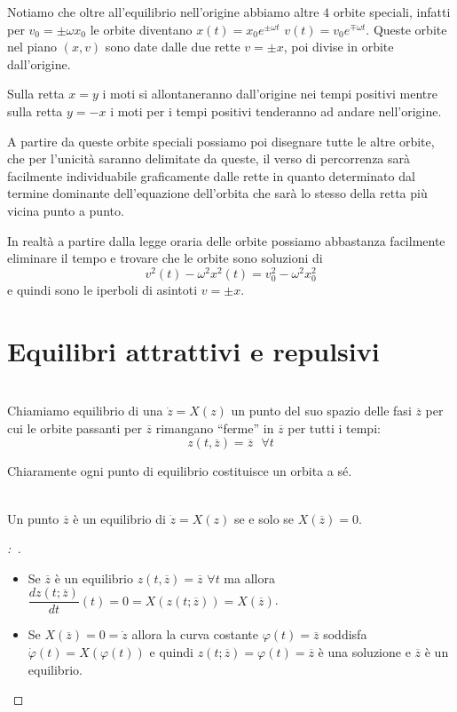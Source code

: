 \documentclass[11pt,a4paper,twoside]{book}
\newenvironment{proposizione}[1][\empty]{\begin{Proposizione}{
\ifx\empty#1\relax\else\mdseries\itshape#1\\\fi
}{}}{\end{Proposizione}}
\newenvironment{definizione}[1][\empty]{\begin{Definizione}{
\ifx\empty#1\relax\else\mdseries\itshape#1\\\fi
}{}}{\end{Definizione}}
\newenvironment{esempio}[1][Esempio]{ 
  \begin{center}\begin{tcolorbox}[
  title={#1:\\},
  width=0.9\linewidth,
  flush right,
  enhanced jigsaw, 
  colback=white, 
  frame hidden, 
  sharpish corners, arc=3mm,
  borderline west = {1pt}{0pt}{gray},
  borderline south = {1pt}{0pt}{gray},
  coltitle=black, 
  fonttitle=\small\bfseries, 
  attach title to upper, 
  breakable,
  top=2.5pt, bottom=0.3pt]\small
  }{
 \normalsize \end{tcolorbox}\end{center}
}
\newenvironment{dimo}[1][\proofname]{
	\begin{tcolorbox}[
	breakable, 
	enhanced, 
	interior hidden, 
	frame hidden, 
	borderline west = {1pt}{0pt}{gray}, 
	top=0pt, bottom=0pt, left=0pt]
\begin{proof}[#1:~]
}
{
\end{proof}
\end{tcolorbox}
}
\theoremstyle{esss}
\theoremstyle{dotless}
\numberwithin{equation}{section} %
\begin{document}
\begin{esempio}[Oscillatore e Repulsore armonico]
\begin{itemize}
Notiamo che oltre all'equilibrio nell'origine abbiamo altre $4$ orbite speciali, infatti per $v_0=\pm\omega x_0$ le orbite diventano $x(t)=x_0e^{\pm\omega t}$ $v(t)=v_0e^{\mp\omega t}$.
Queste orbite nel piano $(x,v)$ sono date dalle due rette $v=\pm x$, poi divise in orbite dall'origine.

Sulla retta $x=y$ i moti si allontaneranno dall'origine nei tempi positivi mentre sulla retta $y=-x$ i moti per i tempi positivi tenderanno ad andare nell'origine.

A partire da queste orbite speciali possiamo poi disegnare tutte le altre orbite, che per l'unicità saranno delimitate da queste, il verso di percorrenza sarà facilmente individuabile graficamente dalle rette in quanto determinato dal termine dominante dell'equazione dell'orbita che sarà lo stesso della retta più vicina punto a punto.

In realtà a partire dalla legge oraria delle orbite possiamo abbastanza facilmente eliminare il tempo e trovare che le orbite sono soluzioni di 
\[
v^2(t)-\omega^2 x^2(t) = v_0^2 - \omega^2 x_0^2
\]
e quindi sono le iperboli di asintoti $v=\pm x$.

\end{itemize}
\end{esempio}


\section{Equilibri attrattivi e repulsivi}

\begin{definizione}
Chiamiamo equilibrio di una $\dot{z}=X(z)$ un punto del suo spazio delle fasi $\overline{z}$ per cui le orbite passanti per $\overline{z}$ rimangano ``ferme'' in $\overline{z}$ per tutti i tempi:
\[
z(t, \overline{z})=\overline{z} \> \> \> \forall t
\]
\end{definizione}

Chiaramente ogni punto di equilibrio costituisce un orbita a sé.

\begin{proposizione}
Un punto $\overline{z}$ è un equilibrio di $\dot{z}=X(z)$ se e solo se $X(\overline{z})=0$.
\end{proposizione}
\begin{dimo}~\begin{itemize}
\item Se $\overline{z}$ è un equilibrio $z(t,\overline{z})=\overline{z}$ $\forall t$ ma allora  $\dfrac{dz(t;\overline{z})}{dt}(t)=0=X(z(t;\overline{z}))=X(\overline{z})$.
\item Se $X(\overline{z})=0=\dot{z}$ allora la curva costante $\varphi(t)=\overline{z}$ soddisfa $\dot{\varphi}(t)=X(\varphi(t))$ e quindi $z(t;\overline{z})=\varphi(t)=\overline{z}$ è una soluzione e $\overline{z}$ è un equilibrio. \qedhere
\end{itemize}
\end{dimo}
\end{document}
